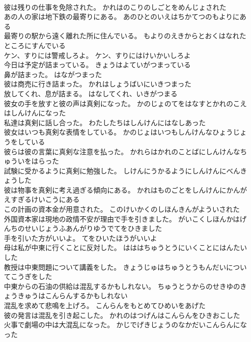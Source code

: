 \documentclass[8pt]{extreport}
\begin{document}
\begin{CJK}{UTF8}{min}
\\	彼は残りの仕事を免除された。	かれはのこりのしごとをめんじょされた 
\\	あの人の家は地下鉄の最寄りにある。	あのひとのいえはちかてつのもよりにある 
\\	最寄りの駅から遠く離れた所に住んでいる。	もよりのえきからとおくはなれたところにすんでいる 
\\	ケン、すりには警戒しろよ。	ケン、すりにはけいかいしろよ 
\\	今日は予定が詰まっている。	きょうはよていがつまっている 
\\	鼻が詰まった。	はながつまった 
\\	彼は商売に行き詰まった。	かれはしょうばいにいきつまった 
\\	放してくれ、息が詰まる。	はなしてくれ、いきがつまる 
\\	彼女の手を放すと彼の声は真剣になった。	かのじょのてをはなすとかれのこえはしんけんになった 
\\	私達は真剣に話し合った。	わたしたちはしんけんにはなしあった 
\\	彼女はいつも真剣な表情をしている。	かのじょはいつもしんけんなひょうじょうをしている 
\\	彼らは彼の言葉に真剣な注意を払った。	かれらはかれのことばにしんけんなちゅういをはらった 
\\	試験に受かるように真剣に勉強した。	しけんにうかるようにしんけんにべんきょうした 
\\	彼は物事を真剣に考え過ぎる傾向にある。	かれはものごとをしんけんにかんがえすぎるけいこうにある 
\\	この計画の資本金が用意された。	このけいかくのしほんきんがよういされた 
\\	外国資本家は現地の政情不安が理由で手を引きました。	がいこくしほんかはげんちのせいじょうふあんがりゆうでてをひきました 
\\	手を引いた方がいいよ。	てをひいたほうがいいよ 
\\	母は私が中東に行くことに反対した。	はははちゅうとうにいくことにはんたいした 
\\	教授は中東問題について講義をした。	きょうじゅはちゅうとうもんだいについてこうぎをした 
\\	中東からの石油の供給は混乱するかもしれない。	ちゅうとうからのせきゆのきょうきゅうはこんらんするかもしれない 
\\	混乱を求めて悲鳴を上げろ。	こんらんをもとめてひめいをあげた 
\\	彼の発言は混乱を引き起こした。	かれのはつげんはこんらんをひきおこした 
\\	火事で劇場の中は大混乱になった。	かじでげきじょうのなかだいこんらんになった 

\end{CJK}
\end{document}
